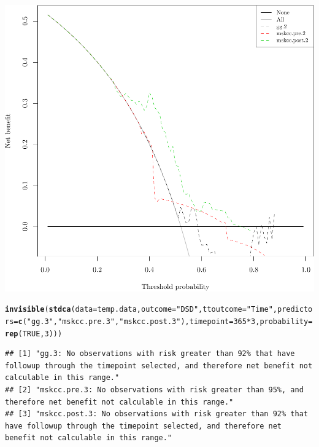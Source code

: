 \documentclass{article}\usepackage[]{graphicx}\usepackage[]{color}
\makeatletter
\def\maxwidth{ %
  \ifdim\Gin@nat@width>\linewidth
    \linewidth
  \else
    \Gin@nat@width
  \fi
}
\newcommand{\hlnum}[1]{\textcolor[rgb]{0.686,0.059,0.569}{#1}}%
\newcommand{\hlstr}[1]{\textcolor[rgb]{0.192,0.494,0.8}{#1}}%
\newcommand{\hlopt}[1]{\textcolor[rgb]{0,0,0}{#1}}%
\newcommand{\hlstd}[1]{\textcolor[rgb]{0.345,0.345,0.345}{#1}}%
\newcommand{\hlkwc}[1]{\textcolor[rgb]{0.333,0.667,0.333}{#1}}%
\newcommand{\hlkwd}[1]{\textcolor[rgb]{0.737,0.353,0.396}{\textbf{#1}}}%
\newenvironment{kframe}{%
 \def\at@end@of@kframe{}%
 \ifinner\ifhmode%
  \def\at@end@of@kframe{\end{minipage}}%
  \begin{minipage}{\columnwidth}%
 \fi\fi%
 \def\FrameCommand##1{\hskip\@totalleftmargin \hskip-\fboxsep
 \colorbox{shadecolor}{##1}\hskip-\fboxsep
     \hskip-\linewidth \hskip-\@totalleftmargin \hskip\columnwidth}%
 \MakeFramed {\advance\hsize-\width
   \@totalleftmargin\z@ \linewidth\hsize
   \@setminipage}}%
 {\par\unskip\endMakeFramed%
 \at@end@of@kframe}
\newenvironment{knitrout}{}{} %
\makeatother
\begin{document}
\begin{knitrout}
{\centering \includegraphics[width=\maxwidth]{figure/07-model-selection-dca-5} 

}


\begin{kframe}\begin{alltt}
\hlkwd{invisible}\hlstd{(}\hlkwd{stdca}\hlstd{(}\hlkwc{data} \hlstd{= temp.data,} \hlkwc{outcome} \hlstd{=} \hlstr{"DSD"}\hlstd{,} \hlkwc{ttoutcome} \hlstd{=} \hlstr{"Time"}\hlstd{,} \hlkwc{predictors} \hlstd{=} \hlkwd{c}\hlstd{(}\hlstr{"gg.3"}\hlstd{,} \hlstr{"mskcc.pre.3"}\hlstd{,} \hlstr{"mskcc.post.3"}\hlstd{),} \hlkwc{timepoint} \hlstd{=} \hlnum{365}\hlopt{*}\hlnum{3}\hlstd{,} \hlkwc{probability} \hlstd{=} \hlkwd{rep}\hlstd{(}\hlnum{TRUE}\hlstd{,} \hlnum{3}\hlstd{)))}
\end{alltt}
\begin{verbatim}
## [1] "gg.3: No observations with risk greater than 92% that have followup through the timepoint selected, and therefore net benefit not calculable in this range."        
## [2] "mskcc.pre.3: No observations with risk greater than 95%, and therefore net benefit not calculable in this range."                                                   
## [3] "mskcc.post.3: No observations with risk greater than 92% that have followup through the timepoint selected, and therefore net benefit not calculable in this range."
\end{verbatim}
\end{kframe}


\end{knitrout}
\end{document}
